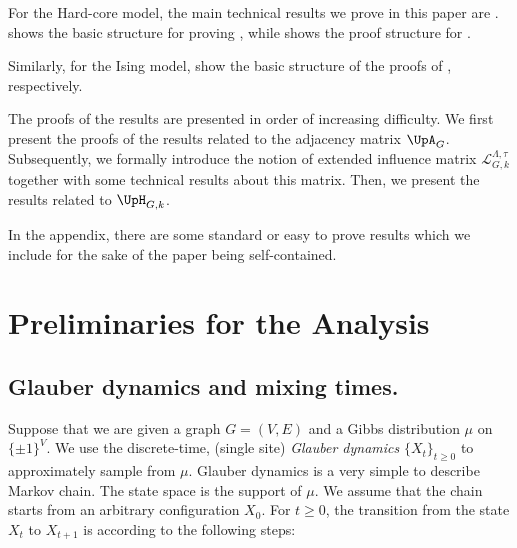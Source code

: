 \documentclass[11pt,reqno]{amsart}
\numberwithin{equation}{section}
\newcommand{\cL}{{\mathcal{L}}}
\newcommand{\applegreen}[1]{ {\color{applegreen}#1}}
\newcommand{\bluepigment}[1]{{\color{blue(pigment)}#1}}
\newcommand{\cadmiumgreen}[1]{{\color{cadmiumgreen}#1}}
\newcommand{\cadmiumorange}[1]{{\color{cadmiumorange}#1}}
\newcommand{\Glauber}{{\{X_{\kt}\}_{\kt\geq 0}}}
\newcommand{\Adjacency}{{\UpA}}
\newcommand{\NBMatrix}{\cadmiumgreen{\UpH}_{G,\kk}}
\newcommand{\spreadpoint}{\newpage}
\newcommand{\LastReviewG}[1]{{\color{magenta}\hspace{.2cm} [Rev: \textrm{#1} - \bluepigment{G} ] \hspace{.2cm}}}
\renewcommand{\LastReviewG}[1]{}
\renewcommand{\spreadpoint}{}
\renewcommand{\applegreen}[1]{#1}
\renewcommand{\bluepigment}[1]{#1}
\renewcommand{\cadmiumgreen}[1]{#1}
\renewcommand{\cadmiumorange}[1]{#1}
\newcommand{\kk}{\bluepigment{k}}
\newcommand{\kt}{\cadmiumorange{t}}
\renewcommand{\kk}{k}
\renewcommand{\kt}{t}
\newcommand{\ExtdInfMatrixF}{\applegreen{\cL}^{\Lambda,\tau}_{G,\kk}}
\begin{document}
For the Hard-core model, the main technical results we prove in this paper are .
 shows  the basic structure for proving  ,
while  shows the proof structure  for   .


Similarly, for the Ising model,    show the basic structure 
of the proofs of  , respectively.

The proofs of the results are presented in  order of increasing difficulty.  We first present the proofs of the results 
related to  the adjacency matrix $\Adjacency_G$. Subsequently, we formally introduce the notion of extended 
influence matrix $\ExtdInfMatrixF$ together with some technical results about this matrix. Then, we   present the results related to $\NBMatrix$. 

In the appendix, there are some standard or easy to prove results which we include for the sake of the paper being self-contained. 




\begin{figure}[omitted: a diagram of this paper's results, not reproduced here]\label{fig:StrctISINGNBacktracking}\end{figure}









\begin{figure}[omitted: a diagram of this paper's results, not reproduced here]\label{fig:StrctISINGAdjacency}\end{figure}






\spreadpoint 
\section{Preliminaries for the Analysis \LastReviewG{2025-03-03}}\label{sec:Preliminaries}





\subsection{Glauber dynamics and mixing times.}\label{sec:MCMCIntroStaff}
%
Suppose that we are given a graph $G=(V,E)$ and  a Gibbs distribution $\mu$ on $\{\pm 1\}^V$. 
We use the discrete-time, (single site) {\em Glauber dynamics} 
$\Glauber$ to approximately sample from $\mu$. Glauber dynamics is a very simple to describe 
Markov chain. The state space is the support of $\mu$.
%
We assume that the chain starts from an arbitrary configuration $X_0$. For 
$\kt\geq 0$, the transition from the state $X_{\kt}$ to $X_{\kt+1}$ is according to the following steps: 
\end{document}
